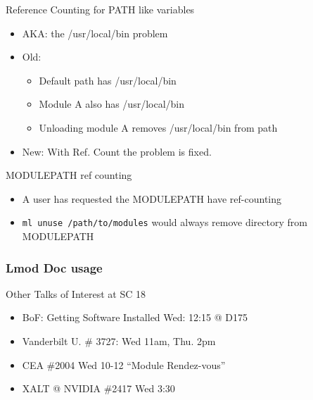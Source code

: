 \documentclass{beamer}
\begin{document}
\begin{frame}{Reference Counting for PATH like variables}
  \begin{itemize}
    \item AKA: the /usr/local/bin problem
    \item Old:
      \begin{itemize}
        \item Default path has /usr/local/bin
        \item Module A also has /usr/local/bin
        \item Unloading module A removes /usr/local/bin from path
      \end{itemize}
    \item New: With Ref. Count the problem is fixed.
  \end{itemize}
\end{frame}

\begin{frame}{MODULEPATH ref counting}
  \begin{itemize}
    \item A user has requested the MODULEPATH have ref-counting
    \item \texttt{ml unuse /path/to/modules} would always remove
      directory from MODULEPATH
  \end{itemize}
\end{frame}

\begin{frame}[fragile]
    \frametitle{Lmod Doc usage}
\end{frame}


\begin{frame}{Other Talks of Interest at SC 18}
  \begin{itemize}
    \item BoF: Getting Software Installed Wed: 12:15 @ D175
    \item Vanderbilt U. \# 3727: Wed 11am, Thu. 2pm
    \item CEA \#2004 Wed 10-12 ``Module Rendez-vous''
    \item XALT @ NVIDIA \#2417 Wed 3:30
  \end{itemize}
\end{frame}
\end{document}
